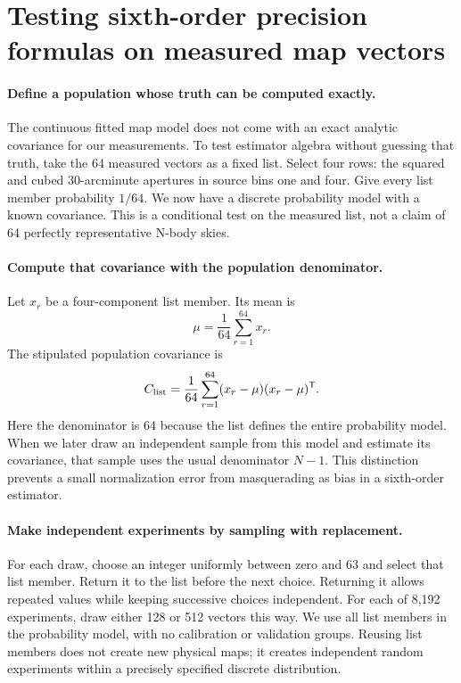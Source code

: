 \documentclass[11pt]{article}
\begin{document}
\section{Testing sixth-order precision formulas on measured map vectors}
\paragraph{Define a population whose truth can be computed exactly.}
The continuous fitted map model does not come with an exact analytic
covariance for our measurements. To test estimator algebra without guessing
that truth, take the 64 measured vectors as a fixed list. Select four rows:
the squared and cubed 30-arcminute apertures in source bins one and four.
Give every list member probability $1/64$. We now have a discrete probability
model with a known covariance. This is a conditional test on the measured
list, not a claim of 64 perfectly representative N-body skies.

\paragraph{Compute that covariance with the population denominator.}
Let $x_r$ be a four-component list member. Its mean is
\begin{equation}
 \mu=\frac1{64}\sum_{r=1}^{64}x_r.
\end{equation}
The stipulated population covariance is
\begin{equation}
 C_{\rm list}=\frac1{64}\sum_{r=1}^{64}(x_r-\mu)(x_r-\mu)^{\mathsf T}.
\end{equation}
Here the denominator is 64 because the list defines the entire probability
model. When we later draw an independent sample from this model and estimate
its covariance, that sample uses the usual denominator $N-1$.
This distinction prevents a small normalization error from masquerading as
bias in a sixth-order estimator.

\paragraph{Make independent experiments by sampling with replacement.}
For each draw, choose an integer uniformly between zero and 63 and select
that list member. Return it to the list before the next choice. Returning
it allows repeated values while keeping successive choices independent.
For each of 8,192 experiments, draw either 128 or 512 vectors this way.
We use all list members in the probability model, with no calibration or
validation groups. Reusing list members does not create new physical maps;
it creates independent random experiments within a precisely specified
discrete distribution.
\end{document}
